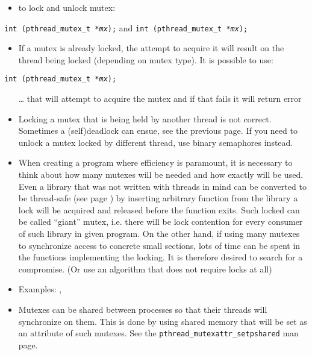 

\begin{slide}

\begin{itemize}
\item to lock and unlock mutex:
\end{itemize}

\texttt{int (pthread\_mutex\_t *\emph{mx});}
\linebreak
and
\linebreak
\texttt{int (pthread\_mutex\_t *\emph{mx});}

\begin{itemize}
\item If a mutex is already locked, the attempt to acquire it will result on the
thread being locked (depending on mutex type).
It is possible to use:
\end{itemize}

\texttt{int (pthread\_mutex\_t *\emph{mx});}

\begin{itemize}
\item[\dots] that will attempt to acquire the mutex and if that fails it will
return error
\end{itemize}
\end{slide}

\label{MUTEXES2}

\begin{itemize}
\item Locking a mutex that is being held by another thread is not correct.
Sometimes a (self)deadlock can ensue, see the previous page. If you need to
unlock a mutex locked by different thread, use binary semaphores instead.
\item When creating a program where efficiency is paramount, it is necessary to
think about how many mutexes will be needed and how exactly will be used.
Even a library that was not written with threads in mind can be converted to be
thread-safe (see page \pageref{THREADSAFE}) by inserting arbitrary function from
the library a lock will be acquired and released before the function exits.
Such locked can be called ``giant'' mutex, i.e. there will be lock contention
for every consumer of such library in given program. On the other hand, if using
many mutexes to synchronize access to concrete small sections, lots of time can
be spent in the functions implementing the locking. It is therefore desired to
search for a compromise. (Or use an algorithm that does not require locks at
all)
\item \label{MUTEX_RACE} Examples: ,
\item Mutexes can be shared between processes so that their threads will
synchronize on them. This is done by using shared memory that will be set as an
attribute of such mutexes. See the
\texttt{pthread\_mutexattr\_setpshared} man page.
\end{itemize}


